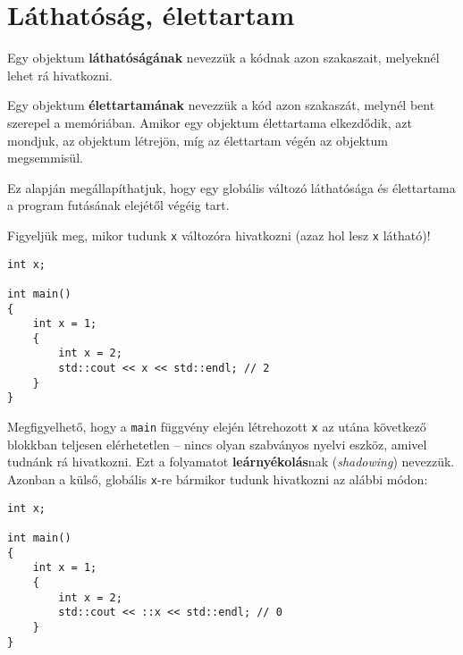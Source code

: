 \documentclass[../cpp_book/cpp_book.tex]{subfiles}
\begin{document}
	\section{Láthatóság, élettartam}
	Egy objektum \textbf{láthatóságának} nevezzük a kódnak azon szakaszait, melyeknél lehet rá hivatkozni.
	\smallskip
	
	Egy objektum \textbf{élettartamának} nevezzük a kód azon szakaszát, melynél bent szerepel a memóriában. Amikor egy objektum élettartama elkezdődik, azt mondjuk, az objektum létrejön, míg az élettartam végén az objektum megsemmisül.
	\medskip
	\begin{note}
		Ez alapján megállapíthatjuk, hogy egy globális változó láthatósága és élettartama a program futásának elejétől végéig tart.
	\end{note}
	
	Figyeljük meg, mikor tudunk \texttt{x} változóra hivatkozni (azaz hol lesz \texttt{x} látható)!
	\begin{lstlisting}
int x;

int main()
{
	int x = 1;
	{
		int x = 2;
		std::cout << x << std::endl; // 2
	}
}
	\end{lstlisting}
	Megfigyelhető, hogy a \texttt{main} függvény elején létrehozott \texttt{x} az utána következő blokkban teljesen elérhetetlen -- nincs olyan szabványos nyelvi eszköz, amivel tudnánk rá hivatkozni. Ezt a folyamatot \textbf{leárnyékolás}nak (\textit{shadowing}) nevezzük. Azonban a külső, globális \texttt{x}-re bármikor tudunk hivatkozni az alábbi módon:
	\begin{lstlisting}
int x;

int main()
{
	int x = 1;
	{
		int x = 2;
		std::cout << ::x << std::endl; // 0
	}
}
	\end{lstlisting}
\end{document}
